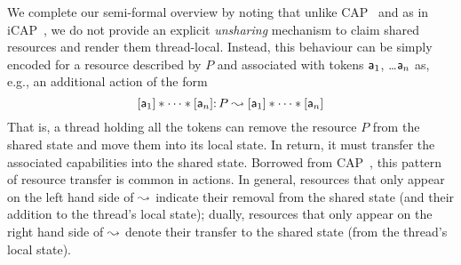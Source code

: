 We complete our semi-formal overview by noting that unlike
CAP~\cite{cap-ecoop10} and as in iCAP~\cite{icap}, we do not provide
an explicit \emph{unsharing} mechanism to claim shared resources and
render them thread-local. Instead, this behaviour can be simply
encoded for a resource described by $P$ and associated with tokens
$\mathsf{a}_1$, \ldots $\mathsf{a}_{n}$ as, e.g., an additional action
of the form
\[
[\mathsf{a}_1] * \cdots * [\mathsf{a}_{n}]{:}\, P \mathrel{\leadsto} [\mathsf{a}_1] * \cdots * [\mathsf{a}_{n}]
\]
That is, a thread holding all the tokens can remove the resource $P$
from the shared state and move them into its local state. In return,
it must transfer the associated capabilities into the shared
state. Borrowed from CAP~\cite{cap-ecoop10}, this pattern of resource
transfer is common in \colosl actions. In general, resources that only
appear on the left hand side of $\mathrel{\leadsto}$ indicate their removal from
the shared state (and their addition to the thread's local state);
dually, resources that only appear on the right hand side of $\mathrel{\leadsto}$
denote their transfer to the shared state (from the thread's local
state).



